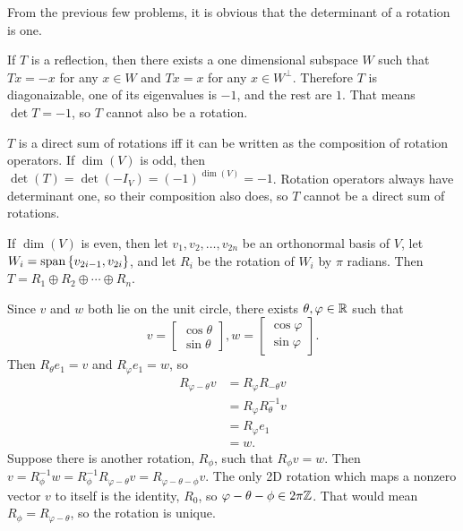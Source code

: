 \documentclass{article}
\begin{document}
\bigskip
\par
\begin{prob}
\end{prob}
From the previous few problems, it is obvious that the determinant of a rotation is one.
\par
If $T$ is a reflection, then there exists a one dimensional subspace $W$ such that $Tx=-x$ for any $x \in W$ and $Tx=x$ for any $x \in W^\perp$. Therefore $T$ is diagonaizable, one of its eigenvalues is $-1$, and the rest are $1$. That means $\det{T}=-1$, so $T$ cannot also be a rotation.

\bigskip
\par
\begin{prob}
\end{prob}
$T$ is a direct sum of rotations iff it can be written as the composition of rotation operators. If $\dim(V)$ is odd, then $\det(T)=\det(-I_V)=(-1)^{\dim(V)}=-1$. Rotation operators always have determinant one, so their composition also does, so $T$ cannot be a direct sum of rotations.
\par
If $\dim(V)$ is even, then let $v_1, v_2, \dots, v_{2n}$ be an orthonormal basis of $V$, let $W_i =\operatorname{span} \left\{ v_{2i-1}, v_{2i} \right\}$, and let $R_i$ be the rotation of $W_i$ by $\pi$ radians. Then $T=R_1 \oplus R_2 \oplus \cdots \oplus R_n$.
\par

\bigskip
\par
\begin{prob}
\end{prob}
Since $v$ and $w$ both lie on the unit circle, there exists $\theta, \varphi \in \mathbb{R}$ such that
\[ v = \begin{bmatrix}
    \cos \theta \\
    \sin \theta
\end{bmatrix}, w = \begin{bmatrix}
    \cos \varphi \\
    \sin \varphi
\end{bmatrix}. \]
Then $R_\theta e_1=v$ and $R_\varphi e_1 = w$, so
\begin{align*}
    R_{\varphi-\theta} v &= R_\varphi R_{-\theta} v \\
                         &= R_\varphi R_\theta^{-1} v \\
                         &= R_\varphi e_1 \\
                         &= w.
\end{align*}
Suppose there is another rotation, $R_\phi$, such that $R_\phi v = w$. Then $v = R_\phi^{-1} w = R_\phi^{-1} R_{\varphi-\theta} v = R_{\varphi-\theta-\phi} v$. The only 2D rotation which maps a nonzero vector $v$ to itself is the identity, $R_0$, so $\varphi-\theta-\phi \in 2\pi \mathbb{Z}$. That would mean $R_\phi=R_{\varphi-\theta}$, so the rotation is unique.


\end{document}
